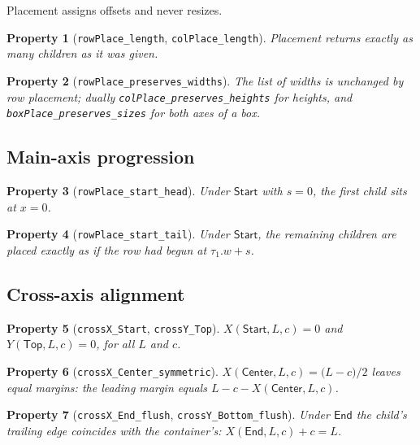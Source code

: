 \documentclass[11pt,a4paper]{article}
\newcommand{\Start}{\mathsf{Start}}
\newcommand{\Center}{\mathsf{Center}}
\newcommand{\End}{\mathsf{End}}
\newcommand{\Top}{\mathsf{Top}}
\theoremstyle{definition}
\theoremstyle{plain}
\newtheorem{property}{Property}[section]
\theoremstyle{remark}
\begin{document}
Placement assigns offsets and never resizes.

\begin{property}[\texttt{rowPlace\_length}, \texttt{colPlace\_length}]
Placement returns exactly as many children as it was given.
\end{property}

\begin{property}[\texttt{rowPlace\_preserves\_widths}]
The list of widths is unchanged by row placement; dually
\texttt{colPlace\_preserves\_heights} for heights, and
\texttt{boxPlace\_preserves\_sizes} for both axes of a box.
\end{property}

\subsection{Main-axis progression}

\begin{property}[\texttt{rowPlace\_start\_head}]
Under $\Start$ with $s = 0$, the first child sits at $x = 0$.
\end{property}

\begin{property}[\texttt{rowPlace\_start\_tail}]
Under $\Start$, the remaining children are placed exactly as if the row had
begun at $\tau_1.w + s$.
\end{property}

\subsection{Cross-axis alignment}

\begin{property}[\texttt{crossX\_Start}, \texttt{crossY\_Top}]
$X(\Start, L, c) = 0$ and $Y(\Top, L, c) = 0$, for all $L$ and $c$.
\end{property}

\begin{property}[\texttt{crossX\_Center\_symmetric}]
$X(\Center, L, c) = \bigl(L - c\bigr)/2$ leaves equal margins:
the leading margin equals $L - c - X(\Center, L, c)$.
\end{property}

\begin{property}[\texttt{crossX\_End\_flush}, \texttt{crossY\_Bottom\_flush}]
Under $\End$ the child's trailing edge coincides with the container's:
$X(\End, L, c) + c = L$.
\end{property}
\end{document}

